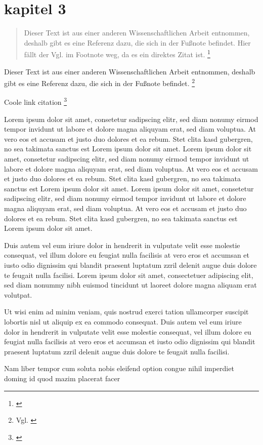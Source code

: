 \section{kapitel 3}

\begin{quote}
    Dieser Text ist aus einer anderen Wissenschaftlichen Arbeit entnommen, deshalb 
gibt es eine Referenz dazu, die sich in der Fußnote befindet. Hier fällt der 
Vgl. im Footnote weg, da es ein direktes Zitat ist. \footnote{ \cite[S. 87]{teller1994visibility}}
\end{quote}

Dieser Text ist aus einer anderen Wissenschaftlichen Arbeit entnommen, deshalb 
gibt es eine Referenz dazu, die sich in der Fußnote befindet. \footnote{Vgl. \cite[S. 57]{teller1994visibility}}


Coole link citation  \footnote{ \cite{Asynchrony}}

Lorem ipsum dolor sit amet, consetetur sadipscing elitr, sed diam nonumy eirmod tempor invidunt ut labore 
et dolore magna aliquyam erat, sed diam voluptua. At vero eos et accusam et justo duo dolores et ea rebum. 
Stet clita kasd gubergren, no sea takimata sanctus est Lorem ipsum dolor sit amet. Lorem ipsum dolor sit 
amet, consetetur sadipscing elitr, sed diam nonumy eirmod tempor invidunt ut labore et dolore magna 
aliquyam erat, sed diam voluptua. At vero eos et accusam et justo duo dolores et ea rebum. Stet clita 
kasd gubergren, no sea takimata sanctus est Lorem ipsum dolor sit amet. Lorem ipsum dolor sit amet, 
consetetur sadipscing elitr, sed diam nonumy eirmod tempor invidunt ut labore et dolore magna aliquyam
 erat, sed diam voluptua. At vero eos et accusam et justo duo dolores et ea rebum. Stet clita kasd
  gubergren, no sea takimata sanctus est Lorem ipsum dolor sit amet.   


Duis autem vel eum iriure dolor in hendrerit in vulputate velit esse molestie consequat, 
vel illum dolore eu feugiat nulla facilisis at vero eros et accumsan et iusto odio dignissim 
qui blandit praesent luptatum zzril delenit augue duis dolore te feugait nulla facilisi.
 Lorem ipsum dolor sit amet, consectetuer adipiscing elit, sed diam nonummy nibh euismod 
 tincidunt ut laoreet dolore magna aliquam erat volutpat.   

Ut wisi enim ad minim veniam, quis nostrud exerci tation ullamcorper suscipit lobortis 
nisl ut aliquip ex ea commodo consequat. Duis autem vel eum iriure dolor in hendrerit
 in vulputate velit esse molestie consequat, vel illum dolore eu feugiat nulla facilisis
  at vero eros et accumsan et iusto odio dignissim qui blandit praesent luptatum zzril 
  delenit augue duis dolore te feugait nulla facilisi.   

Nam liber tempor cum soluta nobis eleifend option congue nihil imperdiet doming id 
quod mazim placerat facer